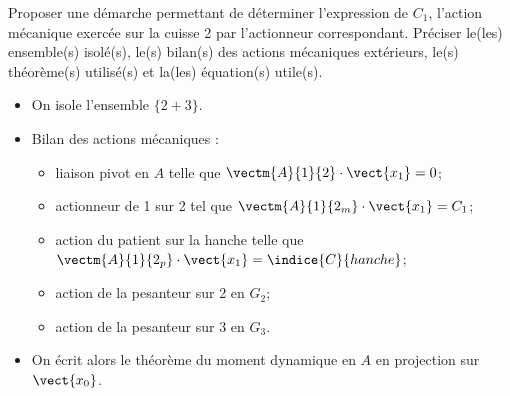 \begin{question}
\label{2023_ccs_psi_q_09}
Proposer une démarche permettant de déterminer l'expression de $C_{1}$, l'action mécanique exercée sur la cuisse 2 par l'actionneur correspondant. Préciser le(les) ensemble(s) isolé(s), le(s) bilan(s) des actions mécaniques extérieurs, le(s) théorème(s) utilisé(s) et la(les) équation(s) utile(s).\\
\end{question}
\ifprof
\begin{corrige}
\begin{itemize}
\item On isole l'ensemble $\{2+3\}$.  
\item Bilan des actions mécaniques : 
\begin{itemize}
\item liaison pivot en $A$ telle que $\vectm{A}{1}{2}\cdot \vect{x_1} = 0$;
\item actionneur de 1 sur 2 tel que  $\vectm{A}{1}{2_m}\cdot \vect{x_1} = C_1$;
\item action du patient sur la hanche telle que  $\vectm{A}{1}{2_p}\cdot \vect{x_1} = \indice{C}{hanche}$;
\item action de la pesanteur sur 2 en $G_2$;
\item action de la pesanteur sur 3 en $G_3$.
\end{itemize}
\item On écrit alors le théorème du moment dynamique en $A$ en projection sur $\vect{x_0}$.
\end{itemize}

\end{corrige}
\else
\fi


